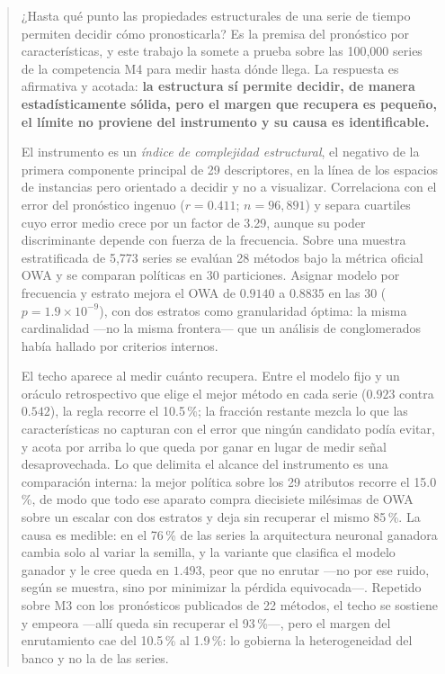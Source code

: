 \maketitle

\begin{abstract}
\noindent
¿Hasta qué punto las propiedades estructurales de una serie de tiempo permiten decidir
cómo pronosticarla? Es la premisa del pronóstico por características, y este trabajo la
somete a prueba sobre las 100{,}000 series de la competencia M4 para medir hasta dónde
llega. La respuesta es afirmativa y acotada: \textbf{la estructura sí permite decidir, de
manera estadísticamente sólida, pero el margen que recupera es pequeño, el límite no
proviene del instrumento y su causa es identificable.}

El instrumento es un \emph{índice de complejidad estructural}, el negativo de la primera
componente principal de 29 descriptores, en la línea de los espacios de instancias
\cite{kang2017} pero orientado a decidir y no a visualizar. Correlaciona con el error del
pronóstico ingenuo ($r=0.411$; $n=96{,}891$) y separa cuartiles cuyo error medio crece por
un factor de 3.29, aunque su poder discriminante depende con fuerza de la frecuencia.
Sobre una muestra estratificada de 5{,}773 series se evalúan 28 métodos bajo la métrica
oficial OWA y se comparan políticas en 30 particiones. Asignar modelo por frecuencia y
estrato mejora el OWA de $0.9140$ a $0.8835$ en las 30 ($p=1.9\times10^{-9}$), con dos
estratos como granularidad óptima: la misma cardinalidad ---no la misma frontera--- que un
análisis de conglomerados había hallado por criterios internos.

El techo aparece al medir cuánto recupera. Entre el modelo fijo y un oráculo retrospectivo
que elige el mejor método en cada serie ($0.923$ contra $0.542$), la regla recorre el
10.5\,\%; la fracción restante mezcla lo que las características no capturan con el error
que ningún candidato podía evitar, y acota por arriba lo que queda por ganar en lugar de
medir señal desaprovechada. Lo que delimita el alcance del instrumento es una comparación
interna: la mejor política sobre los 29 atributos recorre el 15.0\,\%, de modo que todo
ese aparato compra diecisiete milésimas de OWA sobre un escalar con dos estratos y deja
sin recuperar el mismo 85\,\%. La causa es medible: en el 76\,\%
de las series la arquitectura neuronal ganadora cambia solo al variar la semilla, y la
variante que clasifica el modelo ganador y le cree queda en $1.493$, peor que no enrutar
---no por ese ruido, según se muestra, sino por minimizar la pérdida equivocada---.
Repetido sobre M3 con los pronósticos publicados de 22 métodos, el techo se sostiene y
empeora ---allí queda sin recuperar el 93\,\%---, pero el margen del enrutamiento cae del
10.5\,\% al 1.9\,\%: lo gobierna la heterogeneidad del banco y no la de las series.


\end{abstract}
